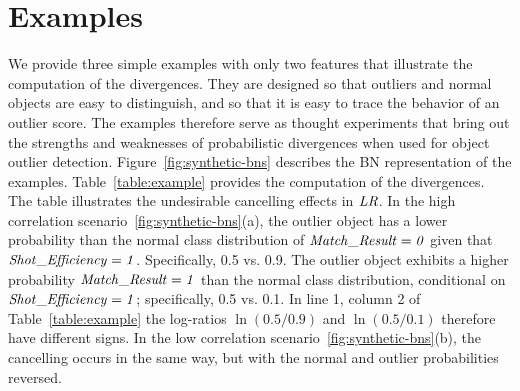 \documentclass[conference]{IEEEtran}
\begin{document}
\section{Examples} \label{sec:divergence-examples} 


We provide three simple examples with only two features that illustrate the computation of the divergences. They are designed so that outliers and normal objects are easy to distinguish, and so that it is easy to trace the behavior of an outlier score.
The examples therefore serve as thought experiments that bring out the strengths and weaknesses of probabilistic divergences when used for object outlier detection. 
Figure~\ref{fig:synthetic-bns} describes the BN representation of the examples. Table~\ref{table:example} provides the computation of the divergences.
% 
The table illustrates the undesirable cancelling effects in $\it{LR}$. In the high correlation scenario~\ref{fig:synthetic-bns}(a), the outlier object has a lower probability than the normal class distribution of $\it{Match\_Result} = 0$ given that $\it{Shot\_Efficiency} = 1$. Specifically, 0.5 vs. 0.9. The outlier object exhibits a higher probability $\it{Match\_Result} = 1$ than the normal class distribution, conditional on $\it{Shot\_Efficiency} = 1$; specifically, 0.5 vs. 0.1. In line 1, column 2 of Table~\ref{table:example}  the log-ratios $\ln(0.5/0.9)$ and $\ln(0.5/0.1)$ therefore have different signs. In the low correlation scenario~\ref{fig:synthetic-bns}(b), the cancelling occurs in the same way, but with the normal and outlier probabilities reversed. 
\end{document}
